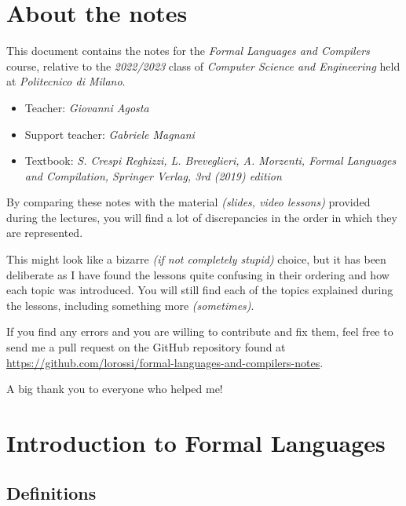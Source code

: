 \documentclass[english]{article}
\begin{document}

\section*{About the notes}

This document contains the notes for the \textit{Formal Languages and Compilers} course, relative to the \textit{2022/2023} class of \textit{Computer Science and Engineering} held at \textit{Politecnico di Milano}.

\bigskip
\begin{itemize}
  \item Teacher: \textit{Giovanni Agosta}
  \item Support teacher: \textit{Gabriele Magnani}
  \item Textbook: \textit{S. Crespi Reghizzi, L. Breveglieri, A. Morzenti, Formal Languages and Compilation, Springer Verlag, 3rd (2019) edition}
\end{itemize}

\bigskip
By comparing these notes with the material \textit{(slides, video lessons)} provided during the lectures, you will find a lot of discrepancies in the order in which they are represented.

This might look like a bizarre \textit{(if not completely stupid)} choice, but it has been deliberate as I have found the lessons quite confusing in their ordering and how each topic was introduced.
You will still find each of the topics explained during the lessons, including something more \textit{(sometimes)}.

\bigskip
If you find any errors and you are willing to contribute and fix them, feel free to send me a pull request on the GitHub repository found at \href{github.com/lorossi/formal-languages-and-compilers-notes}{https://github.com/lorossi/formal-languages-and-compilers-notes}.

\bigskip
A big thank you to everyone who helped me!

\clearpage

\section{Introduction to Formal Languages}


\subsection{Definitions}
\end{document}

